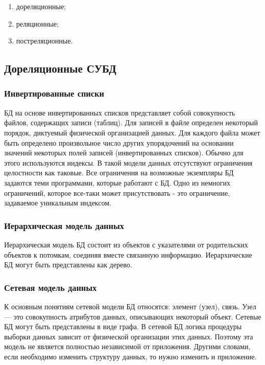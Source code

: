 \begin{enumerate}[label=\arabic*)]
    \item дореляционные;
    \item реляционные;
    \item постреляционные.
\end{enumerate}

\subsection{Дореляционные СУБД}

\subsubsection{Инвертированные списки}
БД на основе инвертированных списков представляет собой совокупность файлов, содержащих записи (таблиц).
Для записей в файле определен некоторый порядок, диктуемый физической организацией данных.
Для каждого файла может быть определено произвольное число других упорядочений на основании значений некоторых полей записей (инвертированных списков).
Обычно для этого используются индексы.
В такой модели данных отсутствуют ограничения целостности как таковые.
Все ограничения на возможные экземпляры БД задаются теми программами, которые работают с БД.
Одно из немногих ограничений, которое все-таки может присутствовать - это ограничение, задаваемое уникальным индексом.

\subsubsection{Иерархическая модель данных}
Иерархическая модель БД состоит из объектов с указателями от родительских объектов к потомкам, соединяя вместе связанную информацию.
Иерархические БД могут быть представлены как дерево.

\subsubsection{Сетевая модель данных}
К основным понятиям сетевой модели БД относятся: элемент (узел), связь.
Узел — это совокупность атрибутов данных, описывающих некоторый
объект.
Сетевые БД могут быть представлены в виде графа.
В сетевой БД логика процедуры выборки данных зависит от физической организации этих данных.
Поэтому эта модель не является полностью независимой от приложения.
Другими словами, если необходимо изменить структуру данных, то нужно изменить и приложение.

